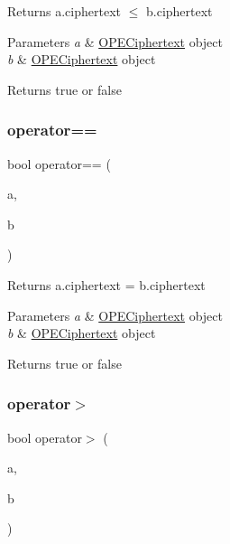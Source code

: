 Returns {\ttfamily a.\+ciphertext} {$\le$} {\ttfamily b.\+ciphertext} 
\begin{DoxyParams}{Parameters}
{\em a} & {\ttfamily \hyperlink{classOPECiphertext}{O\+P\+E\+Ciphertext}} object \\
\hline
{\em b} & {\ttfamily \hyperlink{classOPECiphertext}{O\+P\+E\+Ciphertext}} object \\
\hline
\end{DoxyParams}
\begin{DoxyReturn}{Returns}
{\ttfamily true} or {\ttfamily false} 
\end{DoxyReturn}
\mbox{\label{classOPECiphertext_a434a85cf1acb2e87f59cb598aa67aac1}} 
\subsubsection{\texorpdfstring{operator==}{operator==}}
{\footnotesize\ttfamily bool operator== (\begin{DoxyParamCaption}\item[{const \hyperlink{classOPECiphertext}{O\+P\+E\+Ciphertext} \&}]{a,  }\item[{const \hyperlink{classOPECiphertext}{O\+P\+E\+Ciphertext} \&}]{b }\end{DoxyParamCaption})\hspace{0.3cm}{\ttfamily [friend]}}

Returns {\ttfamily a.\+ciphertext} = {\ttfamily b.\+ciphertext} 
\begin{DoxyParams}{Parameters}
{\em a} & {\ttfamily \hyperlink{classOPECiphertext}{O\+P\+E\+Ciphertext}} object \\
\hline
{\em b} & {\ttfamily \hyperlink{classOPECiphertext}{O\+P\+E\+Ciphertext}} object \\
\hline
\end{DoxyParams}
\begin{DoxyReturn}{Returns}
{\ttfamily true} or {\ttfamily false} 
\end{DoxyReturn}
\mbox{\label{classOPECiphertext_a5a05c9bf39f65f099132a4cb3c030fc0}} 
\subsubsection{\texorpdfstring{operator$>$}{operator>}}
{\footnotesize\ttfamily bool operator$>$ (\begin{DoxyParamCaption}\item[{const \hyperlink{classOPECiphertext}{O\+P\+E\+Ciphertext} \&}]{a,  }\item[{const \hyperlink{classOPECiphertext}{O\+P\+E\+Ciphertext} \&}]{b }\end{DoxyParamCaption})\hspace{0.3cm}{\ttfamily [friend]}}

